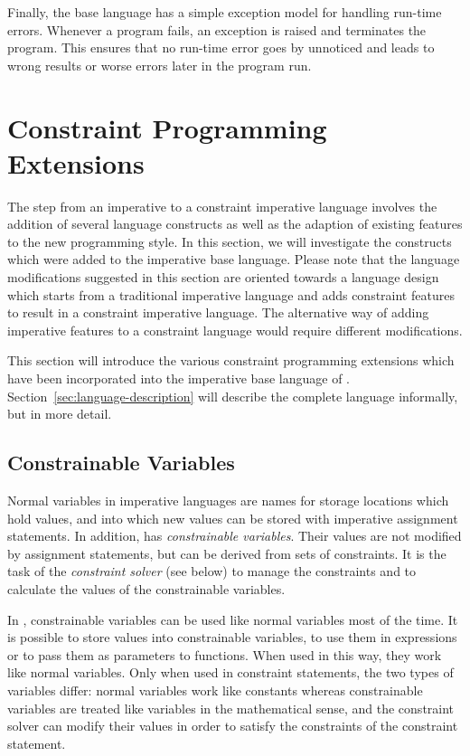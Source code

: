 Finally, the \turtle{} base language has a simple exception model for
handling run-time errors.  Whenever a \turtle{} program fails, an
exception is raised and terminates the program.  This ensures that no
run-time error goes by unnoticed and leads to wrong results or worse
errors later in the program run.

\section{Constraint Programming Extensions}
\label{sec:constraint-programming-extensions}

The step from an imperative to a constraint imperative language
involves the addition of several language constructs as well as the
adaption of existing features to the new programming style.  In this
section, we will investigate the constructs which were added to the
imperative base language.  Please note that the language modifications
suggested in this section are oriented towards a language design which
starts from a traditional imperative language and adds constraint
features to result in a constraint imperative language.  The
alternative way of adding imperative features to a constraint language
would require different modifications.

This section will introduce the various constraint programming
extensions which have been incorporated into the imperative base
language of \turtle{}.  Section~\ref{sec:language-description} will
describe the complete language informally, but in more detail.


\subsection{Constrainable Variables}
\label{sec:constrainable-vars}

%
Normal variables in imperative languages are names for storage
locations which hold values, and into which new values can be stored
with imperative assignment statements.  In addition, \turtle{} has
{\em constrainable variables}.  Their values are not modified by
assignment statements, but can be derived from sets of constraints.
It is the task of the {\em constraint solver} (see below) to manage
the constraints and to calculate the values of the constrainable
variables.

In \turtle{}, constrainable variables can be used like normal
variables most of the time.  It is possible to store values into
constrainable variables, to use them in expressions or to pass them as
parameters to functions.  When used in this way, they work like normal
variables.  Only when used in constraint statements, the two types of
variables differ: normal variables work like constants whereas
constrainable variables are treated like variables in the mathematical
sense, and the constraint solver can modify their values in order to
satisfy the constraints of the constraint statement.

